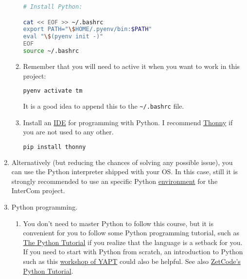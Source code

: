 \begin{enumerate}
\begin{enumerate}
\begin{enumerate}
        
\end{enumerate}
        \begin{lstlisting}[mathescape=false, language=Bash]
# Install Python:

cat << EOF >> ~/.bashrc
export PATH="\$HOME/.pyenv/bin:$PATH"
eval "\$(pyenv init -)"
EOF
source ~/.bashrc
\end{lstlisting}

  \item Remember that you will need to active it when you want to
    work in this project:

    \begin{lstlisting}[language=Bash]
pyenv activate tm
    \end{lstlisting}

    It is a good idea to append this to the \verb|~/.bashrc| file.
    
  \item Install an
    \href{https://en.wikipedia.org/wiki/Integrated_development_environment}{IDE}
    for programming with Python. I recommend
    \href{https://thonny.org/}{Thonny} if you are not used to any
    other.
    
    \begin{lstlisting}[language=Bash]
pip install thonny
    \end{lstlisting}

  \end{enumerate}

  \item Alternatively (but reducing the chances of solving any
    possible issue), you can use the Python interpreter shipped with
    your OS. In this case, still it is strongly recommended to use an
    specific Python
    \href{https://docs.python.org/3/library/venv.html}{environment}
    for the InterCom project.
  
\item Python programming.
  
  \begin{enumerate}
    
  \item You don't need to master Python to follow this course, but it
    is convenient for you to follow some Python programming tutorial,
    such as \href{https://docs.python.org/3/tutorial/}{The Python
    Tutorial} \cite{python-tutorial} if you realize that the language
    is a setback for you. If you need to start with Python from
    scratch, an introduction to Python such as
    this \href{https://github.com/vicente-gonzalez-ruiz/YAPT/tree/master/workshops/programacion_python_ESO}{workshop
    of YAPT} \cite{YAPT} could also be helpful. See
    also \href{http://zetcode.com/lang/python/}{ZetCode's Python
    Tutorial}.
    
  \end{enumerate}

\end{enumerate}

